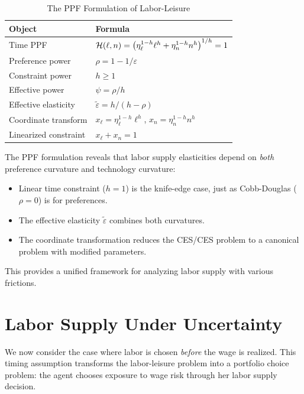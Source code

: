 \begin{table}[H]
\centering
\caption{The PPF Formulation of Labor-Leisure}
\label{tab:labor-ppf-summary}
\renewcommand{\arraystretch}{1.6}
\begin{tabular}{@{}ll@{}}
\toprule
\textbf{Object} & \textbf{Formula} \\
\midrule
Time PPF & $\mathcal{H}(\ell, n) = \left( \eta_\ell^{1-h} \ell^h + \eta_n^{1-h} n^h \right)^{1/h} = 1$ \\[6pt]
Preference power & $\rho = 1 - 1/\varepsilon$ \\[6pt]
Constraint power & $h \geq 1$ \\[6pt]
Effective power & $\psi = \rho / h$ \\[6pt]
Effective elasticity & $\tilde{\varepsilon} = h / (h - \rho)$ \\[6pt]
Coordinate transform & $x_\ell = \eta_\ell^{1-h} \ell^h$, \; $x_n = \eta_n^{1-h} n^h$ \\[6pt]
Linearized constraint & $x_\ell + x_n = 1$ \\[6pt]
\bottomrule
\end{tabular}
\end{table}

\begin{callouttip}
The PPF formulation reveals that labor supply elasticities depend on \emph{both} preference curvature and technology curvature:
\begin{itemize}[nosep]
\item Linear time constraint ($h = 1$) is the knife-edge case, just as Cobb-Douglas ($\rho = 0$) is for preferences.
\item The effective elasticity $\tilde{\varepsilon}$ combines both curvatures.
\item The coordinate transformation reduces the CES/CES problem to a canonical problem with modified parameters.
\end{itemize}
This provides a unified framework for analyzing labor supply with various frictions.
\end{callouttip}


\section{Labor Supply Under Uncertainty}
\label{sec:labor-uncertainty}

We now consider the case where labor is chosen \emph{before} the wage is realized. This timing assumption transforms the labor-leisure problem into a portfolio choice problem: the agent chooses exposure to wage risk through her labor supply decision.

